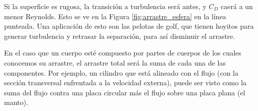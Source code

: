 Si la superficie es rugosa, la transición a turbulencia será antes, y $C_D$ caerá a un menor Reynolds.
Esto se ve en la Figura \ref{fig:arrastre_esfera} en la línea punteada.
Una aplicación de esto son las pelotas de golf, que tienen hoyitos para generar turbulencia y retrasar la separación, para así disminuir el arrastre.

En el caso que un cuerpo esté compuesto por partes de cuerpos de los cuales conocemos su arrastre, el arrastre total será la suma de cada una de las componentes.
Por ejemplo, un cilindro que está alineado con el flujo (con la sección transversal enfrentada a la velocidad externa), puede ser visto como la suma del flujo contra una placa circular más el flujo sobre una placa plana (el manto).
